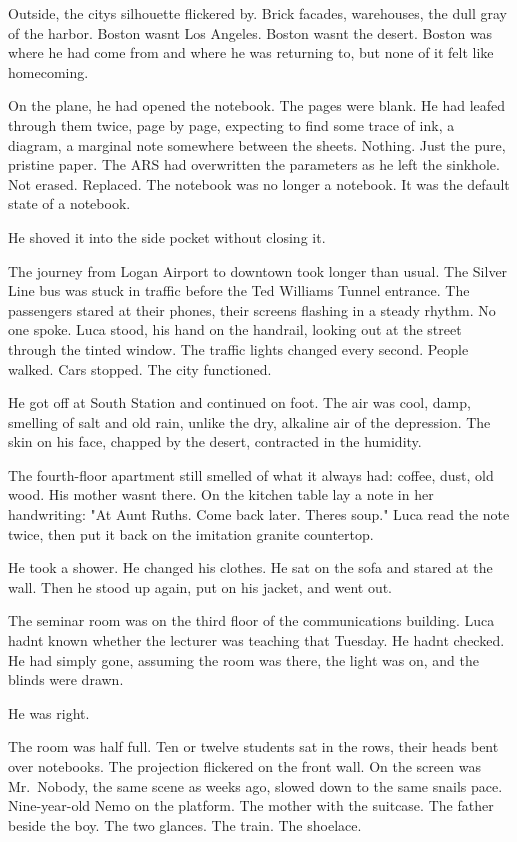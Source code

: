 \documentclass[
  ngerman,
]{article}
\begin{document}
Outside, the city\textquotesingle s silhouette flickered by. Brick
facades, warehouses, the dull gray of the harbor. Boston
wasn\textquotesingle t Los Angeles. Boston wasn\textquotesingle t the
desert. Boston was where he had come from and where he was returning to,
but none of it felt like homecoming.

On the plane, he had opened the notebook. The pages were blank. He had
leafed through them twice, page by page, expecting to find some trace of
ink, a diagram, a marginal note somewhere between the sheets. Nothing.
Just the pure, pristine paper. The ARS had overwritten the parameters as
he left the sinkhole. Not erased. Replaced. The notebook was no longer a
notebook. It was the default state of a notebook.

He shoved it into the side pocket without closing it.

The journey from Logan Airport to downtown took longer than usual. The
Silver Line bus was stuck in traffic before the Ted Williams Tunnel
entrance. The passengers stared at their phones, their screens flashing
in a steady rhythm. No one spoke. Luca stood, his hand on the handrail,
looking out at the street through the tinted window. The traffic lights
changed every second. People walked. Cars stopped. The city functioned.

He got off at South Station and continued on foot. The air was cool,
damp, smelling of salt and old rain, unlike the dry, alkaline air of the
depression. The skin on his face, chapped by the desert, contracted in
the humidity.

The fourth-floor apartment still smelled of what it always had: coffee,
dust, old wood. His mother wasn\textquotesingle t there. On the kitchen
table lay a note in her handwriting: "At Aunt Ruth\textquotesingle s.
Come back later. There\textquotesingle s soup." Luca read the note
twice, then put it back on the imitation granite countertop.

He took a shower. He changed his clothes. He sat on the sofa and stared
at the wall. Then he stood up again, put on his jacket, and went out.

The seminar room was on the third floor of the communications building.
Luca hadn\textquotesingle t known whether the lecturer was teaching that
Tuesday. He hadn\textquotesingle t checked. He had simply gone, assuming
the room was there, the light was on, and the blinds were drawn.

He was right.

The room was half full. Ten or twelve students sat in the rows, their
heads bent over notebooks. The projection flickered on the front wall.
On the screen was Mr.~Nobody, the same scene as weeks ago, slowed down
to the same snail\textquotesingle s pace. Nine-year-old Nemo on the
platform. The mother with the suitcase. The father beside the boy. The
two glances. The train. The shoelace.
\end{document}
